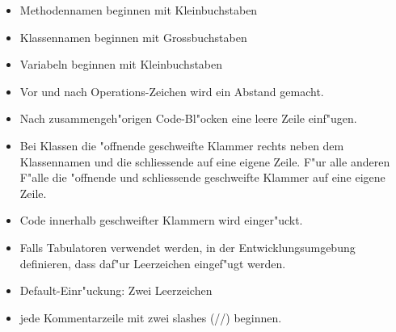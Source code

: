\begin{itemize}
  \item Methodennamen beginnen mit Kleinbuchstaben
  \item Klassennamen beginnen mit Grossbuchstaben
  \item Variabeln beginnen mit Kleinbuchstaben
  \item Vor und nach Operations-Zeichen wird ein Abstand gemacht.
  \item Nach zusammengeh"origen Code-Bl"ocken eine leere Zeile einf"ugen.
  \item Bei Klassen die "offnende geschweifte Klammer rechts neben dem Klassennamen und die schliessende auf eine eigene Zeile.
        F"ur alle anderen F"alle die "offnende und schliessende geschweifte Klammer auf eine eigene Zeile.
  \item Code innerhalb geschweifter Klammern wird einger"uckt.
  \item Falls Tabulatoren verwendet werden, in der Entwicklungsumgebung definieren, dass daf"ur Leerzeichen eingef"ugt werden.
  \item Default-Einr"uckung: Zwei Leerzeichen
  \item jede Kommentarzeile mit zwei slashes (//) beginnen.
\end{itemize}
